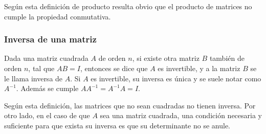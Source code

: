 \documentclass[a4paper]{article}
\begin{document}
\begin{description}
Según esta definición de producto resulta obvio que el producto de matrices no cumple la propiedad conmutativa.
\end{description}

\subsubsection*{Inversa de una matriz}
Dada una matriz cuadrada $A$ de orden $n$, si existe otra matriz $B$ también de orden $n$, tal que $AB=I$, entonces se dice que $A$ es invertible, y a la matriz $B$ se le llama inversa de $A$. Si $A$ es invertible, su inversa es única y se suele notar como $A^{-1}$. Además se cumple $AA^{-1}=A^{-1}A=I$.

Según esta definición, las matrices que no sean cuadradas no tienen inversa. Por otro lado, en el caso de que $A$ sea una matriz cuadrada, una condición necesaria y suficiente para que exista su inversa es que su determinante no se anule.
\end{document}
